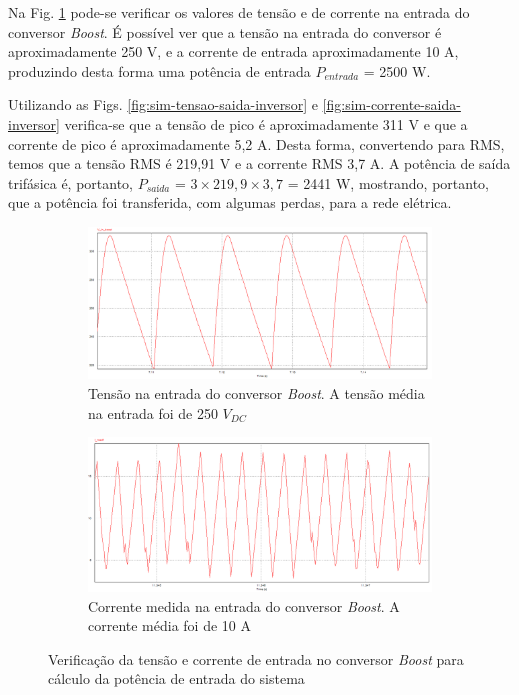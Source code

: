 Na Fig. \ref{fig:sim-tensao-corrente-boost} pode-se verificar os valores de tensão e de corrente na entrada do conversor \textit{Boost}.
É possível ver que a tensão na entrada do conversor é aproximadamente 250 V, e a corrente de entrada aproximadamente 10 A, produzindo desta forma uma potência de entrada $P_{entrada}$ = 2500 W.

Utilizando as Figs. \ref{fig:sim-tensao-saida-inversor} e \ref{fig:sim-corrente-saida-inversor} verifica-se que a tensão de pico é aproximadamente 311 V e que a corrente de pico é aproximadamente 5,2 A.
Desta forma, convertendo para RMS, temos que a tensão RMS é 219,91 V e a corrente RMS 3,7 A. A potência de saída trifásica é, portanto, $P_{saída}$ = $ 3 \times 219,9 \times 3,7$ = 2441 W, mostrando, portanto, que a potência foi transferida, com algumas perdas, para a rede elétrica.

\begin{figure}[!hbt]
	\centering
	\begin{subfigure}[b]{\textwidth}
		\centering
		\includegraphics[width=\textwidth]{figuras/sim_figures/sistema_completo/tensao_entrada_boost_2.PNG}
		\caption{Tensão na entrada do conversor \textit{Boost}. A tensão média na entrada foi de 250 $V_{DC}$}
	\end{subfigure}
	
	\begin{subfigure}[b]{\textwidth}
		\centering
		\includegraphics[width=\textwidth]{figuras/sim_figures/sistema_completo/corrente_entrada_boost_2.PNG}
		\caption{Corrente medida na entrada do conversor \textit{Boost}. A corrente média foi de 10 A}
	\end{subfigure}

	\caption{Verificação da tensão e corrente de entrada no conversor \textit{Boost} para cálculo da potência de entrada do sistema}
    \label{fig:sim-tensao-corrente-boost}
\end{figure}

